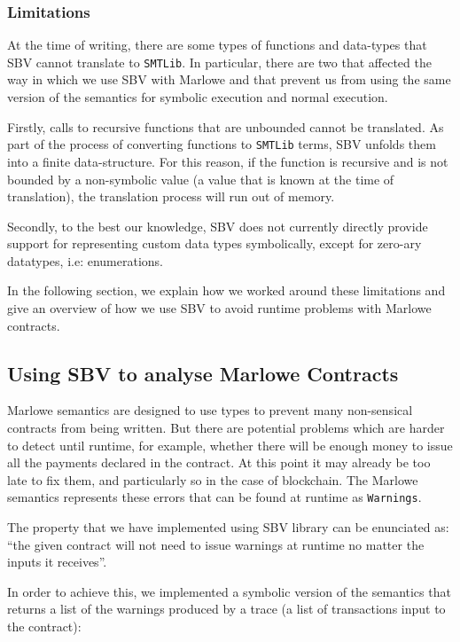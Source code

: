 \documentclass[runningheads]{llncs}
\begin{document}
\subsubsection{Limitations}

At the time of writing, there are some types of functions and data-types that SBV cannot translate to \texttt{SMTLib}. In particular, there are two that affected the way in which we use SBV with Marlowe and that prevent us from using the same version of the semantics for symbolic execution and normal execution.

Firstly, calls to recursive functions that are unbounded cannot be translated. As part of the process of converting functions to \texttt{SMTLib} terms, SBV unfolds them into a finite data-structure. For this reason, if the function is recursive and is not bounded by a non-symbolic value (a value that is known at the time of translation), the translation process will run out of memory.

Secondly, to the best our knowledge, SBV does not currently directly provide support for representing custom data types symbolically, except for zero-ary datatypes, i.e: enumerations.

In the following section, we explain how we worked around these limitations and give an overview of how we use SBV to avoid runtime problems with Marlowe contracts.

\subsection{Using SBV to analyse Marlowe Contracts}

Marlowe semantics are designed to use types to prevent many non-sensical contracts from being written. But there are potential problems which are harder to detect until runtime, for example, whether there will be enough money to issue all the payments declared in the contract. At this point it may already be too late to fix them, and particularly so in the case of blockchain. The Marlowe semantics represents these errors that can be found at runtime as \texttt{Warnings}.

The property that we have implemented using SBV library can be enunciated as: ``the given contract will not need to issue warnings at runtime no matter the inputs it receives''.

In order to achieve this, we implemented a symbolic version of the semantics that returns a list of the warnings produced by a trace (a list of transactions input to the contract):
\end{document}
